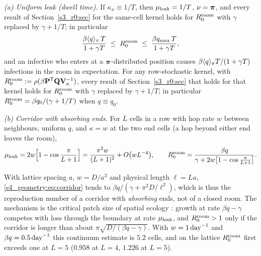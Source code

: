 \begin{corollary}\label{s4_geometry:cor:cases}
  \emph{(a) Uniform leak (dwell time).} If $\kappa_x\equiv1/T$, then $\mu_{\mathrm{leak}}=1/T$, $\nu=\boldsymbol{\pi}$, and every result
  of Section~\ref{s3_r0:sec} for the same-cell kernel holds for $R_0^{\mathrm{room}}$ with $\gamma$ replaced by
  $\gamma+1/T$; in particular
  \begin{equation}\label{s4_geometry:eq:dwell}
     \frac{\beta\langle q\rangle_{\pi}\,T}{1+\gamma T}\;\le\;R_0^{\mathrm{room}}\;\le\;\frac{\beta q_{\max}\,T}{1+\gamma T},
  \end{equation}
  and an infective who enters at a $\boldsymbol{\pi}$-distributed position causes $\beta\langle q\rangle_{\pi} T/(1+\gamma T)$ infections
  in the room in expectation. For any row-stochastic kernel, with $R_0^{\mathrm{room}}:=\rho(\beta\mathbf{P}^{\mathsf{T}}\mathbf{Q}\mathbf{V}_\kappa^{-1})$,
  every result of Section~\ref{s3_r0:sec} that holds for that kernel holds for $R_0^{\mathrm{room}}$ with $\gamma$ replaced by
  $\gamma+1/T$; in particular $R_0^{\mathrm{room}}=\beta q_0/(\gamma+1/T)$ when $q\equiv q_0$.

  \emph{(b) Corridor with absorbing ends.} For $L$ cells in a row with hop rate $w$ between neighbours,
  uniform $q$, and $\kappa=w$ at the two end cells (a hop beyond either end leaves the room),
  \begin{equation}\label{s4_geometry:eq:corridor}
     \mu_{\mathrm{leak}}=2w\Bigl[1-\cos\frac{\pi}{L+1}\Bigr]=\frac{\pi^2w}{(L+1)^2}+O\bigl(wL^{-4}\bigr),\qquad
     R_0^{\mathrm{room}}=\frac{\beta q}{\gamma+2w\bigl[1-\cos\frac{\pi}{L+1}\bigr]} .
  \end{equation}
\end{corollary}

With lattice spacing $a$, $w=D/a^2$ and physical length $\ell=La$, \eqref{s4_geometry:eq:corridor} tends to
$\beta q/(\gamma+\pi^2D/\ell^2)$, which is thus the reproduction number of a corridor with \emph{absorbing}
ends, not of a closed room. The mechanism is the critical patch size of spatial ecology
\citep{skellam1951random,cantrell2003spatial}: growth at rate $\beta q-\gamma$ competes with loss through the
boundary at rate $\mu_{\mathrm{leak}}$, and $R_0^{\mathrm{room}}>1$ only if the corridor is longer than about $\pi\sqrt{D/(\beta q-\gamma)}$.
With $w=1\,\mathrm{day}^{-1}$ and $\beta q=0.5\,\mathrm{day}^{-1}$ this continuum estimate is $5.2$ cells, and on the lattice $R_0^{\mathrm{room}}$
first exceeds one at $L=5$ ($0.958$ at $L=4$, $1.226$ at $L=5$).

